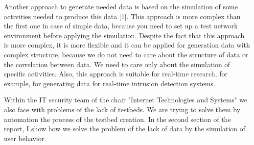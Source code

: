 

Another approach to generate needed data is based on the simulation of some activities needed to produce this data [1]. This approach is more complex than the first one in case of simple data, because you need to set up a test network environment before applying the simulation. Despite the fact that this approach is more complex, it is more flexible and it can be applied for generation data with complex structure, because we do not need to care about the structure of data or the correlation between data. We need to care only about the simulation of specific activities. Also, this approach is suitable for real-time research, for example, for generating data for real-time intrusion detection systems. 

 

Within the IT security team of the chair "Internet Technologies and Systems" we also face with problems of the lack of testbeds. We are trying to solve them by automation the process of the testbed creation. In the second section of the report, I show how we solve the problem of the lack of data by the simulation of user behavior.



